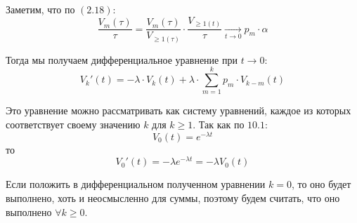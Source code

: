 \documentclass[aps,%
12pt,%
final,%
oneside,
onecolumn,%
musixtex, %
superscriptaddress,%
centertags]{article} %
\theoremstyle{plain}
\theoremstyle{definition}
\theoremstyle{remark}
\begin{document}
Заметим, что по $(2.18)$:
$$\frac{V_m(\tau)}{\tau} = \frac{V_m(\tau)}{V_{\geq 1(\tau)}} \cdot \frac{V_{\geq 1(t)}}{\tau} \xrightarrow[t \to 0]{}p_m \cdot \alpha$$

Тогда мы получаем дифференциальное уравнение при $t \to 0$:
$$V_k'(t) = -\lambda \cdot V_k(t) + \lambda \cdot \sum\limits_{m=1}^k p_m \cdot V_{k-m}(t)$$

Это уравнение можно рассматривать как систему уравнений, каждое из которых соответствует своему значению $k$ для $k \geq 1$. Так как по $10.1$:
$$V_0(t) = e^{-\lambda t}$$ то
$$V_0'(t) = -\lambda e^{-\lambda t} = -\lambda V_0(t)$$

Если положить в дифференциальном полученном уравнении $k=0$, то оно будет выполнено, хоть и неосмысленно для суммы, поэтому будем считать, что оно выполнено $\forall k \geq 0$.
\end{document}

